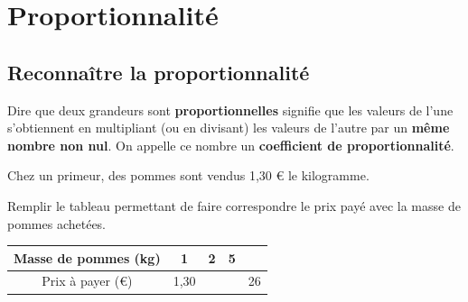 \documentclass[a4paper]{book}
\begin{document}
\setcounter{chapter}{7}
\renewcommand{\monTitre}{Proportionnalité}
\chapter{\monTitre}
\thispagestyle{fancy}


\section{Reconnaître la proportionnalité}

    \begin{definition}
        Dire que deux grandeurs sont \textbf{proportionnelles} signifie que les valeurs de l'une s'obtiennent en multipliant (ou en divisant) les valeurs de l'autre par un \textbf{même nombre non nul}. On appelle ce nombre un \textbf{coefficient de proportionnalité}.

    \end{definition}


    \begin{exemple}
        Chez un primeur, des pommes sont vendus 1,30 € le kilogramme.

        Remplir le tableau permettant de faire correspondre le prix payé avec la masse de pommes achetées.

        \begin{center}
            \renewcommand{\arraystretch}{1.5}
            \begin{tabular}{|c|c|c|c|c|}
                \hline
                Masse de pommes (kg) & 1    & 2 & 5 &  \\ \hline
                Prix à payer (€)     & 1,30 &   &   & 26 \\ \hline
            \end{tabular}
        \end{center}
    \end{exemple}
\end{document}
